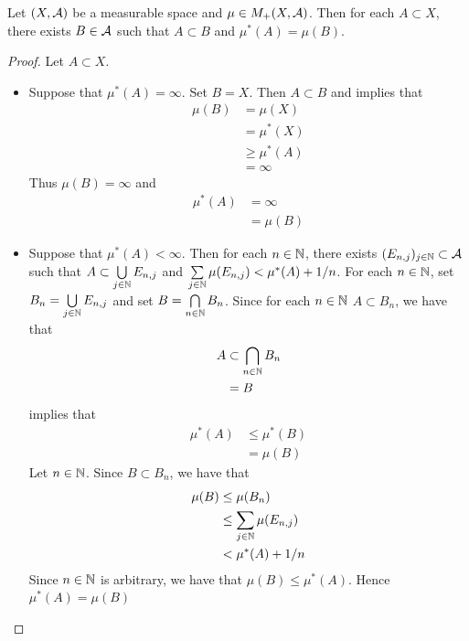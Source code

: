 \documentclass{book}
\begin{document}
	\begin{ex} 
		Let $(X, \mathcal{A})$ be a measurable space and $\mu \in M_+(X, \mathcal{A})$. Then for each $A \subset X$, there exists $B \in \mathcal{A}$ such that $A \subset B$ and $\mu^*(A) = \mu(B)$. 
	\end{ex}
	
	\begin{proof}
		Let $A \subset X$.
		\begin{itemize}
			\item  Suppose that $\mu^*(A) = \infty$. Set $B = X$. Then $A \subset B$ and  implies that
			\begin{align*}
				\mu(B)
				& = \mu(X) \\
				& = \mu^*(X) \\
				& \geq \mu^*(A) \\
				& = \infty 
			\end{align*}
			Thus $\mu(B) = \infty$ and 
			\begin{align*}
				\mu^*(A) 
				& = \infty \\
				& = \mu(B)
			\end{align*} 
			\item Suppose that $\mu^*(A) < \infty$. Then for each $n \in \mathbb{N}$, there exists $(E_{n,j})_{j \in \mathbb{N}} \subset \mathcal{A}$ such that $A \subset \bigcup\limits_{j \in \mathbb{N}} E_{n,j}$ and $\sum\limits_{j \in \mathbb{N}} \mu(E_{n,j}) < \mu^*(A) + 1/n$. For each $n \in \mathbb{N}$, set $B_n = \bigcup\limits_{j \in \mathbb{N}} E_{n,j} $ and set $B = \bigcap\limits_{n \in \mathbb{N}} B_n$. Since for each $n \in \mathbb{N}$ $A \subset B_n$, we have that 
			\begin{align*}
				A
				& \subset \bigcap\limits_{n \in \mathbb{N}} B_n \\
				& = B
			\end{align*}
			 implies that
			\begin{align*}
				\mu^*(A)
				& \leq \mu^*(B) \\
				& = \mu(B)
			\end{align*}
			Let $n \in \mathbb{N}$. Since $B \subset B_n$, we have that 
			\begin{align*}
				\mu(B)
				& \leq \mu(B_n) \\
				& \leq \sum\limits_{j \in \mathbb{N}} \mu(E_{n,j}) \\
				& < \mu^*(A) + 1/n 
			\end{align*}
			Since $n \in \mathbb{N}$ is arbitrary, we have that $\mu(B) \leq \mu^*(A)$. Hence $\mu^*(A) = \mu(B)$
		\end{itemize}
	\end{proof}
	
\end{document}
